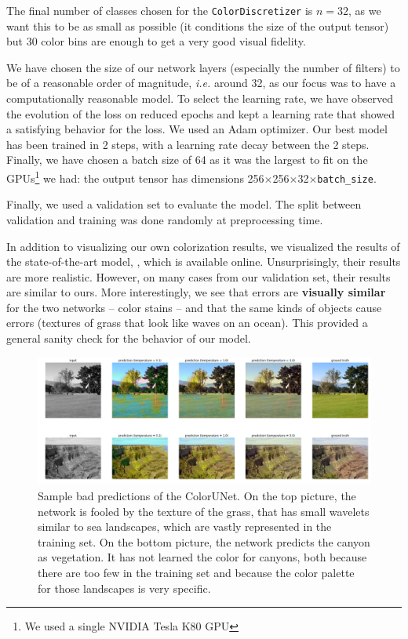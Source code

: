 \documentclass[10pt,twocolumn,letterpaper]{article}
\begin{document}
The final number of classes chosen for the \texttt{ColorDiscretizer} is $n=32$, as we want this to be as small as possible (it conditions the size of the output tensor) but 30 color bins are enough to get a very good visual fidelity.

We have chosen the size of our network layers (especially the number of filters) to be of a reasonable order of magnitude, \textit{i.e.} around 32, as our focus was to have a computationally reasonable model. To select the learning rate, we have observed the evolution of the loss on reduced epochs and kept a learning rate that showed a satisfying behavior for the loss. We used an Adam optimizer. Our best model has been trained in 2 steps, with a learning rate decay between the 2 steps. Finally, we have chosen a batch size of 64 as it was the largest to fit on the GPUs\footnote{We used a single NVIDIA Tesla K80 GPU} we had: the output tensor has dimensions 256$\times$256$\times$32$\times$\texttt{batch\_size}.

Finally, we used a validation set to evaluate the model. The split between validation and training  was done randomly at preprocessing time.

In addition to visualizing our own colorization results, we visualized the results of the state-of-the-art model, \cite{zhang2016colorful}, which is available online. Unsurprisingly, their results are more realistic. However, on many cases from our validation set, their results are similar to ours. More interestingly, we see that errors are \textbf{visually similar} for the two networks -- \ie color stains -- and that the same kinds of objects cause errors (\eg textures of grass that look like waves on an ocean). This provided a general sanity check for the behavior of our model.
\begin{figure}
\begin{center}
\includegraphics[width=450px]{worse}
\caption{Sample bad predictions of the ColorUNet. On the top picture, the network is fooled by the texture of the grass, that has small wavelets similar to sea landscapes, which are vastly represented in the training set. On the bottom picture, the network predicts the canyon as vegetation. It has not learned the color for canyons, both because there are too few in the training set and because the color palette for those landscapes is very specific.}
\label{worse}
\end{center}
\end{figure}
\end{document}
